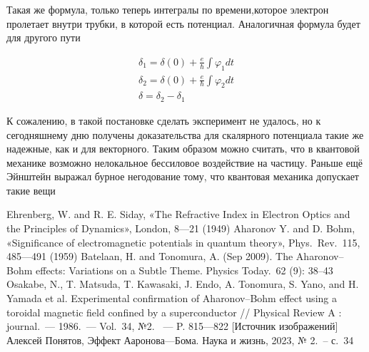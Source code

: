 \documentclass[a4paper, 14pt]{article}
\begin{document}
    Такая же формула, только теперь интегралы по времени,которое электрон пролетает внутри трубки, в
    которой есть потенциал.
    Аналогичная формула будет для другого пути
    
    \begin{gather}
        \delta_1 = \delta(0) + \frac{e}{\hbar} \int \varphi_1 dt \\
        \delta_2 = \delta(0) + \frac{e}{\hbar} \int \varphi_2 dt \\
        \delta = \delta_2 - \delta_1
    \end{gather}
    
    К сожалению, в такой постановке сделать эксперимент не удалось, но к сегодняшнему дню получены доказательства
    для скалярного потенциала такие же надежные, как и для векторного.
    Таким образом можно считать, что в квантовой механике возможно нелокальное бессиловое воздействие на частицу.
    Раньше ещё Эйнштейн выражал бурное негодование тому, что квантовая механика допускает такие вещи
    
    \begin{thebibliography}{} 
    
         Ehrenberg, W. and R. E. Siday, «The Refractive Index in Electron Optics and the Principles of
        Dynamics», London, 8—21 (1949)
         Aharonov Y. and D. Bohm, «Significance of electromagnetic potentials in quantum theory»,
        Phys.~Rev.~115, 485—491 (1959)
         Batelaan, H. and Tonomura, A. (Sep 2009).
        The Aharonov–Bohm effects: Variations on a Subtle Theme.
        Physics Today.~62 (9): 38–43
         Osakabe, N., T. Matsuda, T. Kawasaki, J. Endo, A. Tonomura, S. Yano, and H. Yamada et al.
        Experimental confirmation of Aharonov–Bohm effect using a toroidal magnetic field confined by a superconductor
        // Physical Review A : journal.~— 1986.~— Vol.~34, №2.~ — P. 815—822
         [Источник изображений] Алексей Понятов, Эффект Ааронова—Бома.
        Наука и жизнь, 2023, № 2.~-- с.~34
    \end{thebibliography}
\end{document}
